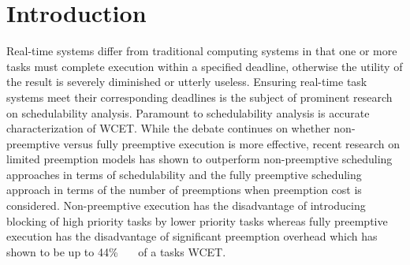 \vspace{-10pt}
\section{Introduction}\label{sec:introduction}

Real-time systems differ from traditional computing systems in that one or more tasks must complete execution within a specified deadline, otherwise the utility of the result is severely diminished or utterly useless.  Ensuring real-time task systems meet their corresponding deadlines is the subject of prominent research on schedulability analysis.  Paramount to schedulability analysis is accurate characterization of WCET.  While the debate continues on whether non-preemptive versus fully preemptive execution is more effective, recent research on limited preemption models has shown to outperform non-preemptive scheduling approaches in terms of schedulability and the fully preemptive scheduling approach in terms of the number of preemptions when preemption cost is considered.  Non-preemptive execution has the disadvantage of introducing blocking of high priority tasks by lower priority tasks whereas fully preemptive execution has the disadvantage of significant preemption overhead which has shown to be up to 44\%~\cite{pellizzoni:07}~\cite{pellizzoni:08}~\cite{pellizzoni:11} of a tasks WCET.

